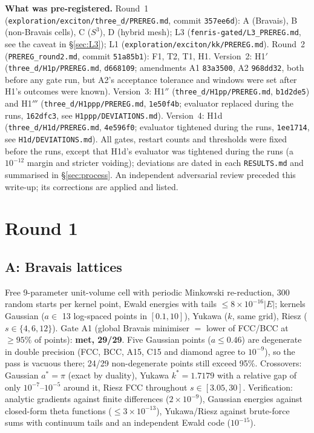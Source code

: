 \documentclass[11pt,a4paper]{article}
\begin{document}
\begin{keybox}
\textbf{What was pre-registered.} Round~1 (\texttt{exploration/exciton/three\_d/PREREG.md}, commit \texttt{357ee6d}): A (Bravais),
B (non-Bravais cells), C ($S^3$), D (hybrid mesh); L3 (\texttt{fenris-gated/L3\_PREREG.md}, see the caveat in \S\ref{sec:L3});
L1 (\texttt{exploration/exciton/kk/PREREG.md}). Round~2 (\texttt{PREREG\_round2.md}, commit \texttt{51a85b1}): F1, T2, T1, H1.
Version~2: H1$'$ (\texttt{three\_d/H1p/PREREG.md}, \texttt{d668109}; amendments A1 \texttt{83a3500}, A2 \texttt{968dd32}, both before
any gate run, but A2's acceptance tolerance and windows were set after H1's outcomes were known).
Version~3: H1$''$ (\texttt{three\_d/H1pp/PREREG.md}, \texttt{b1d2de5}) and H1$'''$ (\texttt{three\_d/H1ppp/PREREG.md},
\texttt{1e50f4b}; evaluator replaced during the runs, \texttt{162dfc3}, see \texttt{H1ppp/DEVIATIONS.md}).
Version~4: H1d (\texttt{three\_d/H1d/PREREG.md}, \texttt{4e596f0}; evaluator tightened during the runs, \texttt{1ee1714}, see
\texttt{H1d/DEVIATIONS.md}).
All gates, restart counts and thresholds were fixed before the runs, except that H1d's evaluator was tightened during the runs
(a $10^{-12}$ margin and stricter voiding); deviations are dated in each \texttt{RESULTS.md} and
summarised in \S\ref{sec:process}. An independent adversarial review preceded this write-up; its corrections are applied and
listed.
\end{keybox}

\section{Round 1}

\subsection{A: Bravais lattices}
Free 9-parameter unit-volume cell with periodic Minkowski re-reduction, 300 random starts per kernel point, Ewald energies with
tails $\le8\times10^{-16}|E|$; kernels Gaussian ($a\in$ 13 log-spaced points in $[0.1,10]$), Yukawa ($k$, same grid), Riesz
($s\in\{4,6,12\}$). Gate A1 (global Bravais minimiser $=$ lower of FCC/BCC at $\ge95\%$ of points): \textbf{met, 29/29}. Five Gaussian
points ($a\le0.46$) are degenerate in double precision (FCC, BCC, A15, C15 and diamond agree to $10^{-9}$), so the pass is
vacuous there; 24/29 non-degenerate points still exceed 95\%. Crossovers: Gaussian $a^*=\pi$ (exact by duality), Yukawa
$k^*=1.7179$ with a relative gap of only $10^{-7}$--$10^{-5}$ around it, Riesz FCC throughout $s\in[3.05,30]$. Verification:
analytic gradients against finite differences ($2\times10^{-9}$), Gaussian energies against closed-form theta functions
($\le3\times10^{-13}$), Yukawa/Riesz against brute-force sums with continuum tails and an independent Ewald code ($10^{-15}$).
\end{document}
